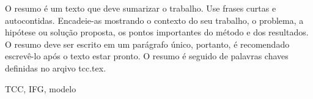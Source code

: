 O resumo é um texto que deve sumarizar o trabalho.
Use frases curtas e autocontidas. 
Encadeie-as mostrando o contexto do seu trabalho, o problema, a hipótese ou solução proposta, os pontos importantes do método e dos resultados.
O resumo deve ser escrito em um parágrafo único, portanto, é recomendado escrevê-lo após o texto estar pronto. 
O resumo é seguido de palavras chaves definidas no arqivo tcc.tex.

\begin{keywords}
TCC, IFG, modelo 
\end{keywords}
